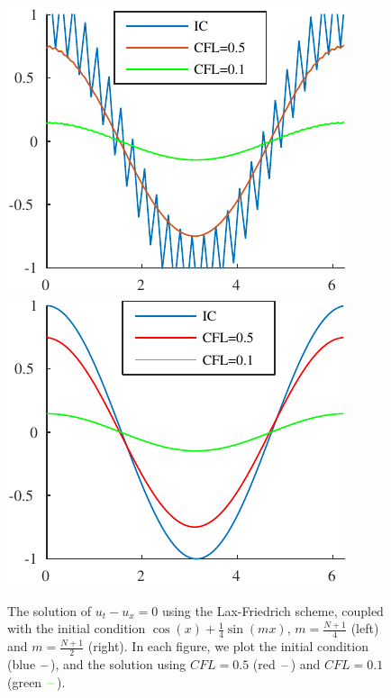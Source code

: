 \documentclass[10pt,a4paper,twoside, french]{article}
\numberwithin{equation}{section}
\numberwithin{figure}{section}
\numberwithin{table}{section}
\begin{document}
\begin{enumerate}
\begin{enumerate}[a.]
\newpage
~
\newpage
\begin{figure}[h!]
\centering
\includegraphics[scale=1]{fig/LAXF_IC1}
\includegraphics[scale=1]{fig/LAXF_IC2}
\caption{The solution of $u_t-u_x=0$ using the Lax-Friedrich scheme, coupled with the initial condition $\cos(x)+\frac{1}{4}\sin(mx)$, $m=\frac{N+1}{4}$ (left) and $m=\frac{N+1}{2}$ (right). In each figure, we plot the initial condition (blue $\color{blue} -$), and the solution using $CFL=0.5$ (red $\color{red} -$) and $CFL=0.1$ (green $\color{green} -$).}
\end{figure}


\end{enumerate}
\end{enumerate}
\end{document}
